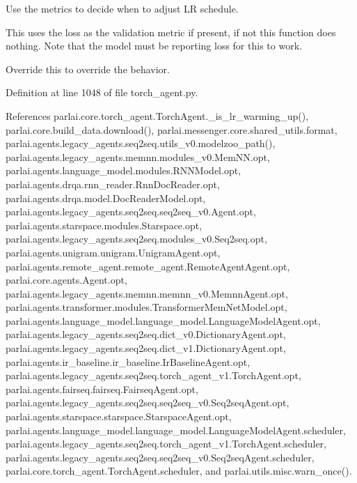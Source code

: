 \begin{DoxyVerb}Use the metrics to decide when to adjust LR schedule.

This uses the loss as the validation metric if present, if not this
function does nothing. Note that the model must be reporting loss for
this to work.

Override this to override the behavior.
\end{DoxyVerb}
 

Definition at line 1048 of file torch\+\_\+agent.\+py.



References parlai.\+core.\+torch\+\_\+agent.\+Torch\+Agent.\+\_\+is\+\_\+lr\+\_\+warming\+\_\+up(), parlai.\+core.\+build\+\_\+data.\+download(), parlai.\+messenger.\+core.\+shared\+\_\+utils.\+format, parlai.\+agents.\+legacy\+\_\+agents.\+seq2seq.\+utils\+\_\+v0.\+modelzoo\+\_\+path(), parlai.\+agents.\+legacy\+\_\+agents.\+memnn.\+modules\+\_\+v0.\+Mem\+N\+N.\+opt, parlai.\+agents.\+language\+\_\+model.\+modules.\+R\+N\+N\+Model.\+opt, parlai.\+agents.\+drqa.\+rnn\+\_\+reader.\+Rnn\+Doc\+Reader.\+opt, parlai.\+agents.\+drqa.\+model.\+Doc\+Reader\+Model.\+opt, parlai.\+agents.\+legacy\+\_\+agents.\+seq2seq.\+seq2seq\+\_\+v0.\+Agent.\+opt, parlai.\+agents.\+starspace.\+modules.\+Starspace.\+opt, parlai.\+agents.\+legacy\+\_\+agents.\+seq2seq.\+modules\+\_\+v0.\+Seq2seq.\+opt, parlai.\+agents.\+unigram.\+unigram.\+Unigram\+Agent.\+opt, parlai.\+agents.\+remote\+\_\+agent.\+remote\+\_\+agent.\+Remote\+Agent\+Agent.\+opt, parlai.\+core.\+agents.\+Agent.\+opt, parlai.\+agents.\+legacy\+\_\+agents.\+memnn.\+memnn\+\_\+v0.\+Memnn\+Agent.\+opt, parlai.\+agents.\+transformer.\+modules.\+Transformer\+Mem\+Net\+Model.\+opt, parlai.\+agents.\+language\+\_\+model.\+language\+\_\+model.\+Language\+Model\+Agent.\+opt, parlai.\+agents.\+legacy\+\_\+agents.\+seq2seq.\+dict\+\_\+v0.\+Dictionary\+Agent.\+opt, parlai.\+agents.\+legacy\+\_\+agents.\+seq2seq.\+dict\+\_\+v1.\+Dictionary\+Agent.\+opt, parlai.\+agents.\+ir\+\_\+baseline.\+ir\+\_\+baseline.\+Ir\+Baseline\+Agent.\+opt, parlai.\+agents.\+legacy\+\_\+agents.\+seq2seq.\+torch\+\_\+agent\+\_\+v1.\+Torch\+Agent.\+opt, parlai.\+agents.\+fairseq.\+fairseq.\+Fairseq\+Agent.\+opt, parlai.\+agents.\+legacy\+\_\+agents.\+seq2seq.\+seq2seq\+\_\+v0.\+Seq2seq\+Agent.\+opt, parlai.\+agents.\+starspace.\+starspace.\+Starspace\+Agent.\+opt, parlai.\+agents.\+language\+\_\+model.\+language\+\_\+model.\+Language\+Model\+Agent.\+scheduler, parlai.\+agents.\+legacy\+\_\+agents.\+seq2seq.\+torch\+\_\+agent\+\_\+v1.\+Torch\+Agent.\+scheduler, parlai.\+agents.\+legacy\+\_\+agents.\+seq2seq.\+seq2seq\+\_\+v0.\+Seq2seq\+Agent.\+scheduler, parlai.\+core.\+torch\+\_\+agent.\+Torch\+Agent.\+scheduler, and parlai.\+utils.\+misc.\+warn\+\_\+once().

